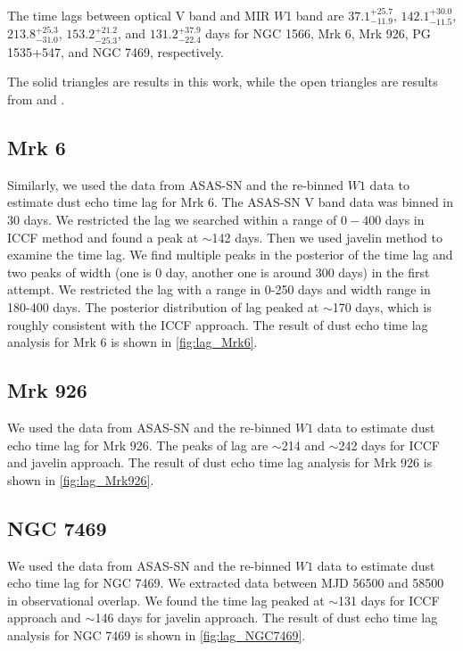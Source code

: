 The time lags between optical V band and MIR $W$1 band are $37.1^{+25.7}_{-11.9}$, $142.1^{+30.0}_{-11.5}$, $213.8^{+25.3}_{-31.0}$, $153.2^{+21.2}_{-25.3}$, and $131.2^{+37.9}_{-22.4}$ days for NGC 1566, Mrk 6, Mrk 926, PG 1535+547, and NGC 7469, respectively.

The solid triangles are results in this work, while the open triangles are results from \citet{2014ApJ...788..159K} and \citet{2019ApJ...886...33L}.


\subsection{Mrk 6}
Similarly, we used the data from ASAS-SN and the re-binned $W1$ data to estimate dust echo time lag for Mrk 6. The ASAS-SN V band data was binned in 30 days. We restricted the lag we searched within a range of $0-400$ days in ICCF method and found a peak at $\sim$142 days. Then we used {\sc javelin} method to examine the time lag. We find multiple peaks in the posterior of the time lag and two peaks of width (one is 0 day, another one is around 300 days) in the first attempt. We restricted the lag with a range in 0-250 days and width range in 180-400 days. The posterior distribution of lag peaked at $\sim$170 days, which is roughly consistent with the ICCF approach. The result of dust echo time lag analysis for Mrk 6 is shown in \autoref{fig:lag_Mrk6}. 




\subsection{Mrk 926}
We used the data from ASAS-SN and the re-binned $W1$ data to estimate dust echo time lag for Mrk 926. The peaks of lag are $\sim$214 and $\sim$242 days for ICCF and {\sc javelin} approach. The result of dust echo time lag analysis for Mrk 926 is shown in \autoref{fig:lag_Mrk926}. 


\subsection{NGC 7469}
We used the data from ASAS-SN and the re-binned $W1$ data to estimate dust echo time lag for NGC 7469. We extracted data between MJD 56500 and 58500 in observational overlap. We found the time lag peaked at $\sim$131 days for ICCF approach and $\sim$146 days for {\sc javelin} approach. The result of dust echo time lag analysis for NGC 7469 is shown in \autoref{fig:lag_NGC7469}.


